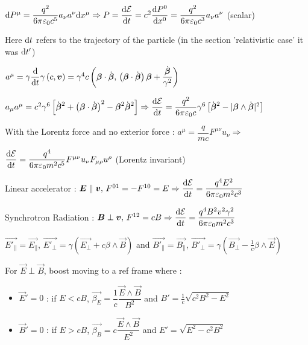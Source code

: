 \item $\textrm{d} P^{\mu } =  \dfrac{q^2}{6\pi \varepsilon_0 c^5}a_{\nu}a^{\nu} \textrm{d} x^{\mu} \Rightarrow P = \dfrac{\textrm{d} \mathcal{E}}{\textrm{d} t} = c^2 \dfrac{\textrm{d} P^0}{\textrm{d} x^0} = \dfrac{q^2}{6\pi\varepsilon_0c^3} a_{\nu}a^{\nu}$ (scalar)

\item Here $\textrm{d} t$ refers to the trajectory of the particle (in the section 'relativistic case' it was $\textrm{d} t'$)

\item $a^{\mu} = \gamma \dfrac{\textrm{d}}{\textrm{d} t} \gamma \left(c, \mbox{\boldmath$v$}\right) = \gamma^4 c \left(\mbox{\boldmath$\beta$}\cdot\dot{\mbox{\boldmath$\beta$}}, \, \left(\mbox{\boldmath$\beta$}\cdot\dot{\mbox{\boldmath$\beta$}}\right)\mbox{\boldmath$\beta$} + \dfrac{\dot{\mbox{\boldmath$\beta$}}}{\gamma^2}\right)$

\item $a_{\mu}a^{\mu} = c^2\gamma^6 \left[ \dot{\mbox{\boldmath$\beta$}}^2 + \left(\mbox{\boldmath$\beta$}\cdot\dot{\mbox{\boldmath$\beta$}}\right)^2 -\mbox{\boldmath$\beta$}^2 \dot{\mbox{\boldmath$\beta$}}^2   \right] \Rightarrow \dfrac{\textrm{d} \mathcal{E}}{\textrm{d} t} = \dfrac{q^2}{6\pi\varepsilon_0c}\gamma^6 \left[\dot{\mbox{\boldmath$\beta$}}^2 - |\mbox{\boldmath$\beta$} \wedge \dot{\mbox{\boldmath$\beta$}}|^2\right]$

\item[] With the Lorentz force and no exterior force : $a^{\mu} = \dfrac{q}{mc} F^{\mu\nu}u_{\nu} \Rightarrow $

\item $\dfrac{\textrm{d} \mathcal{E}}{\textrm{d} t} =  \dfrac{q^4}{6\pi\varepsilon_0m^2c^5}F^{\mu\nu}u_{\nu}F_{\mu\rho}u^{\rho}$ \quad (Lorentz invariant)
\squishend
{}

\squishlist
\item Linear accelerator : $ \mbox{\boldmath$E$} \parallel \mbox{\boldmath$v$}, \, F^{01} = -F^{10} = E \Rightarrow \dfrac{\textrm{d} \mathcal{E}}{\textrm{d} t} = \dfrac{q^4E^2}{6\pi\varepsilon_0m^2c^3}$

\item Synchrotron Radiation : $\mbox{\boldmath$B$} \perp \mbox{\boldmath$v$}, \, F^{12} = cB \Rightarrow \dfrac{\textrm{d} \mathcal{E}}{\textrm{d} t} = \dfrac{q^4B^2v^2\gamma^2}{6\pi\varepsilon_0m^2c^3}$
\squishend

\squishlist
\item $\vec{E'_{\parallel}}=\vec{E_{\parallel}}$, $\vec{E'_\perp}=\gamma(\vec{E_\perp}+c\beta\wedge\vec{B})$ and $\vec{B'_{\parallel}}=\vec{B_{\parallel}}$, $\vec{B'_\perp}=\gamma(\vec{B_\perp}-\frac{1}{c}\beta\wedge\vec{E})$

\item For $\vec{E}\perp\vec{B}$, boost moving to a ref frame where : 
\begin{itemize}
\item $\vec{E}'=0$ : if $E<cB$, $\vec{\beta_E}=\dfrac{1}{c}\dfrac{\vec{E}\wedge\vec{B}}{B^2}$ and $B'=\frac{1}{c}\sqrt{c^2B^2-E^2}$ 
\item $\vec{B}'=0$ : if $E>cB$, $\vec{\beta_B}=c\dfrac{\vec{E}\wedge\vec{B}}{E^2}$ and $E'=\sqrt{E^2-c^2B^2}$
\end{itemize}

